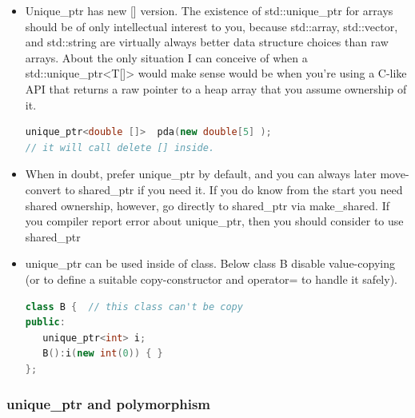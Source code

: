 \documentclass[a4paper,12pt,twoside]{book}
\begin{document}
\begin{itemize}
\item Unique\_ptr has new [] version. The existence of std::unique\_ptr for arrays should be of only intellectual interest to you, because std::array, std::vector, and std::string are virtually always better data structure choices than raw arrays. About the only situation I can conceive of when a std::unique\_ptr<T[]> would make sense would be when you're using a C-like API that returns a raw pointer to a heap array that you assume ownership of it.
\begin{lstlisting}[frame=single, language=c++]
unique_ptr<double []>  pda(new double[5] );
// it will call delete [] inside.
\end{lstlisting}


\item When in doubt, prefer unique\_ptr by default, and you can always later move-convert to shared\_ptr if you need it. If you do know from the start you need shared ownership, however, go directly to shared\_ptr via make\_shared. If you compiler report error about unique\_ptr, then you should consider to use shared\_ptr


\item unique\_ptr can be used inside of class. Below class B disable value-copying (or to define a suitable copy-constructor  and operator= to handle it safely).
\begin{lstlisting}[frame=single, language=c++]
class B {  // this class can't be copy
public:
   unique_ptr<int> i;
   B():i(new int(0)) { }
};
\end{lstlisting}

\end{itemize}


\subsubsection{unique\_ptr and polymorphism}
\end{document}
